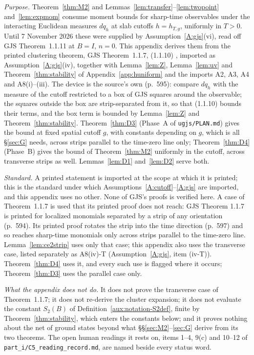 \documentclass[11pt,a4paper]{article}
\theoremstyle{plain}
\theoremstyle{definition}
\theoremstyle{plain}
\theoremstyle{definition}
\begin{document}
\emph{Purpose.}  Theorem~\ref{thm:M2} and Lemmas~\ref{lem:transfer}--\ref{lem:twopoint}
and~\ref{lem:expmom} consume moment bounds for sharp-time observables under the interacting
Euclidean measures $dq_h$ at slab cutoffs $h=h_{T,g}$, uniformly in $T>0$.  Until 7 November
2026 these were supplied by Assumption~\ref{A:gjs}(vi), read off GJS Theorem~1.1.11 at $B=I$,
$n=0$.  This appendix derives them from the printed clustering theorem, GJS Theorem~1.1.7,
(1.1.10) \cite[p.~594]{GJS}, imported as Assumption~\ref{A:gjs}(iv), together with
Lemma~\ref{lem:Z}, Lemma~\ref{lem:uv} and Theorem~\ref{thm:stability} of
Appendix~\ref{app:huniform} and the imports A2, A3, A4 and A8(i)--(iii).  The device is the
source's own (p.~595): compare $dq_h$ with the measure of the cutoff restricted to a box of
GJS squares around the observable; the squares outside the box are strip-separated from it,
so that (1.1.10) bounds their terms, and the box term is bounded by Lemma~\ref{lem:Z} and
Theorem~\ref{thm:stability}.  Theorem~\ref{thm:D3} (Phase~A of \texttt{ugjs/PLAN.md}) gives
the bound at fixed spatial cutoff $g$, with constants depending on $g$, which is all
\S\ref{sec:G} needs, across strips parallel to the time-zero line only; Theorem~\ref{thm:D4}
(Phase~B) gives the bound of Theorem~\ref{thm:M2} uniformly in the cutoff, across transverse
strips as well.  Lemmas~\ref{lem:D1} and~\ref{lem:D2} serve both.

\emph{Standard.}  A printed statement is imported at the scope at which it is printed; this
is the standard under which Assumptions~\ref{A:cutoff}--\ref{A:gjs} are imported, and this
appendix uses no other.  None of GJS's proofs is verified here.  A case of Theorem~1.1.7 is
used that its printed proof does not reach: GJS Theorem 1.1.7 is printed for localized
monomials separated by a strip of any orientation (p.~594). Its printed proof rotates the
strip into the time direction (p.~597) and so reaches sharp-time monomials only across strips
parallel to the time-zero line. Lemma~\ref{lem:ce2strip} uses only that case; this appendix
also uses the transverse case, listed separately as A8(iv)-T (Assumption~\ref{A:gjs}, item
(iv-T)).  Theorem~\ref{thm:D4} uses it, and every such use is flagged where it occurs;
Theorem~\ref{thm:D3} uses the parallel case only.

\emph{What the appendix does not do.}  It does not prove the transverse case of
Theorem~1.1.7; it does not re-derive the cluster expansion; it does not evaluate the
constant $S_2(B)$ of Definition~\ref{aux:notation-S2def}, finite by Theorem~\ref{thm:stability},
which enters the constants below; and
it proves nothing about the net of ground states beyond what \S\S\ref{sec:M2}--\ref{sec:G}
derive from its two theorems.  The open human readings it rests on, items 1--4, 9(c) and 10--12 of
\texttt{part\_i/C5\_reading\_record.md}, are named beside every status word.
\end{document}
